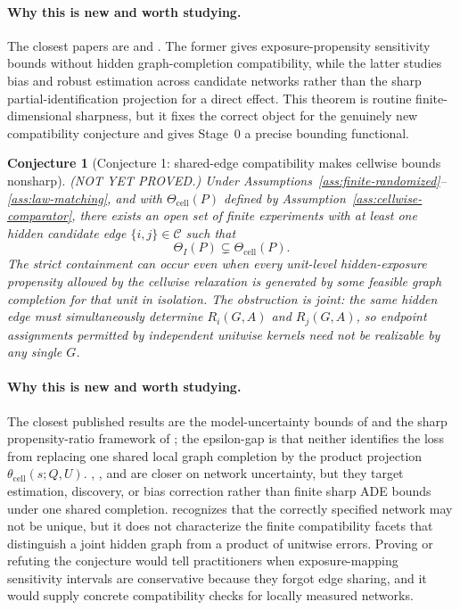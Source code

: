 \documentclass[11pt]{article}
\theoremstyle{definition}
\theoremstyle{plain}
\newtheorem{conjecture}{Conjecture}
\theoremstyle{remark}
\begin{document}
\paragraph{Why this is new and worth studying.}
The closest papers are \citet{SchroderOprescuFeuerriegelKallus2026} and \citet{WeinsteinNevo2026}.  The former gives exposure-propensity sensitivity bounds without hidden graph-completion compatibility, while the latter studies bias and robust estimation across candidate networks rather than the sharp partial-identification projection for a direct effect.  This theorem is routine finite-dimensional sharpness, but it fixes the correct object for the genuinely new compatibility conjecture and gives Stage~0 a precise bounding functional.

\begin{conjecture}[Conjecture 1: shared-edge compatibility makes cellwise bounds nonsharp]\label{conj:cellwise-nonsharp}
(NOT YET PROVED.)  Under Assumptions~\ref{ass:finite-randomized}--\ref{ass:law-matching}, and with \(\Theta_{\mathrm{cell}}(P)\) defined by Assumption~\ref{ass:cellwise-comparator}, there exists an open set of finite experiments with at least one hidden candidate edge \(\{i,j\}\in\mathcal C\) such that
\[
\Theta_I(P)\subsetneq \Theta_{\mathrm{cell}}(P).
\]
The strict containment can occur even when every unit-level hidden-exposure propensity allowed by the cellwise relaxation is generated by some feasible graph completion for that unit in isolation.  The obstruction is joint: the same hidden edge must simultaneously determine \(R_i(G,A)\) and \(R_j(G,A)\), so endpoint assignments permitted by independent unitwise kernels need not be realizable by any single \(G\).
\end{conjecture}
\paragraph{Why this is new and worth studying.}
The closest published results are the model-uncertainty bounds of \citet{ZhangMohanPearl2023} and the sharp propensity-ratio framework of \citet{SchroderOprescuFeuerriegelKallus2026}; the epsilon-gap is that neither identifies the loss from replacing one shared local graph completion by the product projection \(\theta_{\mathrm{cell}}(s;Q,U)\).  \citet{Egami2020}, \citet{BhattacharyaMalinskyShpitser2020}, and \citet{LiSussmanKolaczyk2021} are closer on network uncertainty, but they target estimation, discovery, or bias correction rather than finite sharp ADE bounds under one shared completion.  \citet{WeinsteinNevo2026} recognizes that the correctly specified network may not be unique, but it does not characterize the finite compatibility facets that distinguish a joint hidden graph from a product of unitwise errors.  Proving or refuting the conjecture would tell practitioners when exposure-mapping sensitivity intervals are conservative because they forgot edge sharing, and it would supply concrete compatibility checks for locally measured networks.
\end{document}
